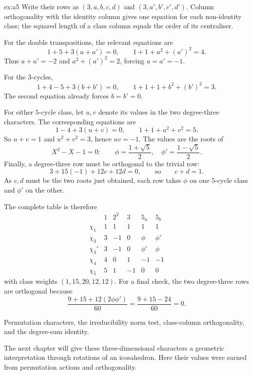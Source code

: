 \begin{solution}{ex:a5}
Write their rows as $(3,a,b,c,d)$ and $(3,a',b',c',d')$. Column orthogonality with the identity column gives one equation for each non-identity class; the squared length of a class column equals the order of its centraliser.

For the double transpositions, the relevant equations are
\[
1+5+3(a+a')=0,\qquad
1+1+a^2+(a')^2=4.
\]
Thus $a+a'=-2$ and $a^2+(a')^2=2$, forcing $a=a'=-1$.

For the $3$-cycles,
\[
1+4-5+3(b+b')=0,\qquad
1+1+1+b^2+(b')^2=3.
\]
The second equation already forces $b=b'=0$.

For either $5$-cycle class, let $u,v$ denote its values in the two degree-three characters. The corresponding equations are
\[
1-4+3(u+v)=0,\qquad
1+1+u^2+v^2=5.
\]
So $u+v=1$ and $u^2+v^2=3$, hence $uv=-1$. The values are the roots of
\[
X^2-X-1=0:
\qquad \phi=\frac{1+\sqrt5}{2},\quad
\phi'=\frac{1-\sqrt5}{2}.
\]
Finally, a degree-three row must be orthogonal to the trivial row:
\[
3+15(-1)+12c+12d=0,
\qquad\text{so}\qquad c+d=1.
\]
As $c,d$ must be the two roots just obtained, each row takes $\phi$ on one $5$-cycle class and $\phi'$ on the other.

The complete table is therefore
\[
\begin{array}{c|rrrrr}
&1&2^2&3&5_a&5_b\\\hline
\chi_1&1&1&1&1&1\\
\chi_3&3&-1&0&\phi&\phi'\\
\chi_3'&3&-1&0&\phi'&\phi\\
\chi_4&4&0&1&-1&-1\\
\chi_5&5&1&-1&0&0
\end{array}
\]
with class weights $(1,15,20,12,12)$. For a final check, the two degree-three rows are orthogonal because
\[
\frac{9+15+12(2\phi\phi')}{60}
=\frac{9+15-24}{60}=0.
\]

\tools Permutation characters, the irreducibility norm test, class-column orthogonality, and the degree-sum identity.

\leads The next chapter will give these three-dimensional characters a geometric interpretation through rotations of an icosahedron. Here their values were earned from permutation actions and orthogonality.
\end{solution}

